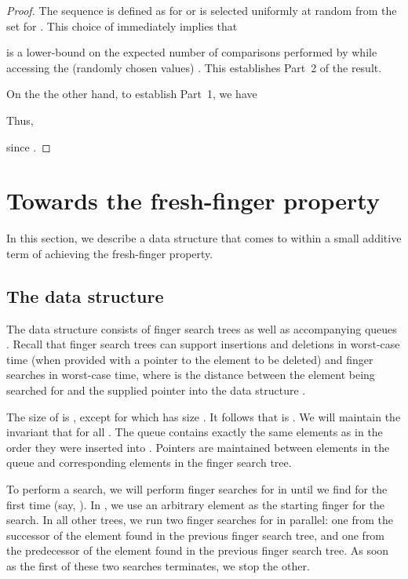 \documentclass{llncs}
\begin{document}
\begin{proof}
  The sequence  is defined as  for  or  is selected
  uniformly at random from the set  for .  This
  choice of  immediately implies that 
  
  is a lower-bound on the expected number of comparisons performed by 
  while accessing the (randomly chosen values) .
  This establishes Part~2 of the result.

  On the the other hand, to establish Part~1, we have
  
  Thus,
  
  since .
\end{proof}



\section{Towards the fresh-finger property}
\label{section:main}

In this section, we describe a data structure that comes to within a small additive term of achieving the fresh-finger property.

\subsection{The data structure}
\label{section:main:datastructure}

The data structure consists of  finger search trees  as well as  accompanying queues . Recall that finger search trees can support insertions and deletions in  worst-case time (when provided with a pointer to the element to be deleted) and finger searches in  worst-case time, where  is the distance between the element being searched for and the supplied pointer into the data structure \cite{DBLP:journals/jcss/BrodalLMTT03}. 

The size of  is , except for  which has size . It follows that  is . We will maintain the invariant that  for all . The queue  contains exactly the same elements as  in the order they were inserted into . Pointers are maintained between elements in the queue and corresponding elements in the finger search tree.

To perform a search, we will perform finger searches for  in  until we find  for the first time (say, ). In , we use an arbitrary element as the starting finger for the search. In all other trees, we run two finger searches for  in parallel: one from the successor of the element found in the previous finger search tree, and one from the predecessor of the element found in the previous finger search tree. As soon as the first of these two searches terminates, we stop the other. 
\end{document}
